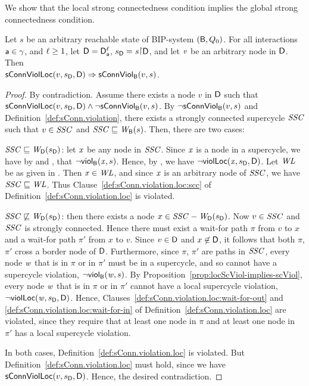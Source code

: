 We show that the local strong connectedness condition implies the global strong connectedness condition.

\begin{proposition}
\label{prop:locConnViol-implies-ConnViol}
 \label{prop:locConnViol-implies-connViol}
Let $s$ be an arbitrary reachable state of BIP-system $(\B, Q_0)$.
For all interactions $\act \in \gamma$, and $\l \ge 1$, let $\DS = \dsks{\act}{\l}$, $\sD = s \pj \dsk{\act}{\l}$, and let $\ndv$ be an arbitrary node in $\dsk{\act}{\l}$.
Then\\
\ind $\locConnViol{v}{\sD}{\act}{\l} \imp \connViol{v}{s}$.
\end{proposition}
%
\begin{proof}
By contradiction. Assume there exists a node $v$ in $\dsk{a}{\l}$ such that $\locConnViol{v}{\sD}{\act}{\l} \land \neg \connViol{v}{s}$.
By $\neg \connViol{v}{s}$ and Definition~\ref{def:sConn.violation}, there exists a strongly connected
supercycle $\SSC$ such that $v \in \SSC$ and $\SSC \subg \wfg{\B}{s}$. Then, there are two cases:
%
\bn
\item $\SSC \subg \wfg{\dsk{a}{\l}}{\sD}$: let $\ndx$ be any node in $\SSC$. Since $\ndx$ is a node in a supercycle, we have by
   and , that $\neg \scV{\ndx}{s}$. 
   Hence, by ,  we have $\neg \scVL{\ndx}{\sD}{\act}{\l}$. 
   Let $\WL$ be as given in .
  Then $\ndx \in \WL$, and since $\ndx$ is an arbitrary node of $\SSC$, we have $\SSC \subg \WL$. 
  Thus Clause~\ref{def:sConn.violation.loc:scc} of Definition~\ref{def:sConn.violation.loc} is violated.

\item $\SSC \not\subg \wfg{\dsk{a}{\l}}{\sD}$: then there exists a node $x \in \SSC - \wfg{\dsk{a}{\l}}{\sD}$.
  Now $v \in \SSC$ and $\SSC$ is strongly connected. Hence there must exist a wait-for path $\pi$
  from $v$ to $x$ and a wait-for path $\pi'$ from $x$ to
  $v$. Since $v \in \dsk{a}{\l}$ and $x \not\in \dsk{a}{\l}$, it
  follows that both $\pi$, $\pi'$  cross a border node of
  $\dsk{a}{\l}$. Furthermore, since $\pi$, $\pi'$ are paths in $\SSC$, every node $\ndw$ that is
  in $\pi$ or in $\pi'$ must be in a supercycle, and so cannot have a supercycle violation, \ie $\neg \scV{\ndw}{s}$. 
  By Proposition~\ref{prop:locScViol-implies-scViol}, every node $\ndw$ that is
  in $\pi$ or in $\pi'$ cannot have a local supercycle violation, \ie $\neg \scVL{\ndw}{\sD}{\act}{\l}$.
  Hence, Clauses~\ref{def:sConn.violation.loc:wait-for-out} and
  \ref{def:sConn.violation.loc:wait-for-in} of Definition~\ref{def:sConn.violation.loc} are violated,
  since they require that at least one node in $\pi$ and at least one node in $\pi'$ has a local supercycle violation.
  
\en
In both cases,  Definition~\ref{def:sConn.violation.loc} is violated. 
But  Definition~\ref{def:sConn.violation.loc} must hold, since we have $\locConnViol{v}{\sD}{\act}{\l}$. 
Hence, the desired contradiction.
\end{proof}



